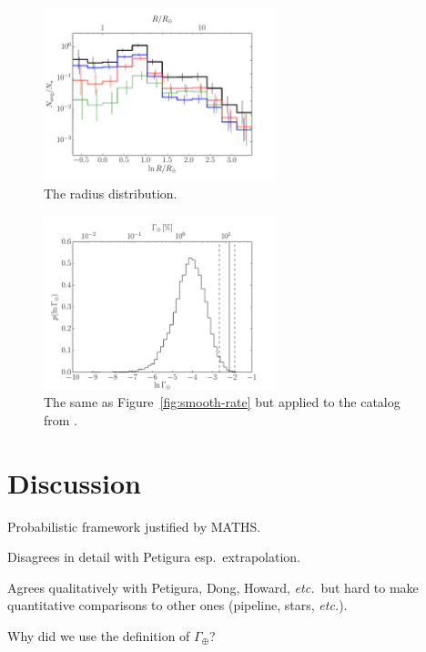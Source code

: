 \documentclass[12pt,preprint]{aastex}
\newcommand{\foreign}[1]{\emph{#1}}
\newcommand{\etc}{\foreign{etc.}}
\newcommand{\Fig}[1]{Figure~\ref{fig:#1}}
\newcommand{\fig}[1]{\Fig{#1}}
\newcommand{\figlabel}[1]{\label{fig:#1}}
\newcommand{\rate}{\ensuremath{\Gamma}}
\newcommand{\gammaearth}{{\ensuremath{\rate_\oplus}}}
\begin{document}
\begin{figure}[p]
\begin{center}
\includegraphics[width=0.6\textwidth]{figures/results/radius.pdf}
\end{center}
\caption{%
The radius distribution.
\figlabel{radius}}
\end{figure}

\begin{figure}[p]
\begin{center}
\includegraphics[width=0.6\textwidth]{figures/results/rate.pdf}
\end{center}
\caption{%
The same as \fig{smooth-rate} but applied to the catalog from \citet{petigura}.
\figlabel{real-rate}}
\end{figure}

\section{Discussion}

Probabilistic framework justified by MATHS.

Disagrees in detail with Petigura esp.\ extrapolation.

Agrees qualitatively with Petigura, Dong, Howard, \etc\ but hard to make
quantitative comparisons to other ones (pipeline, stars, \etc).

Why did we use the definition of \gammaearth?
\end{document}
